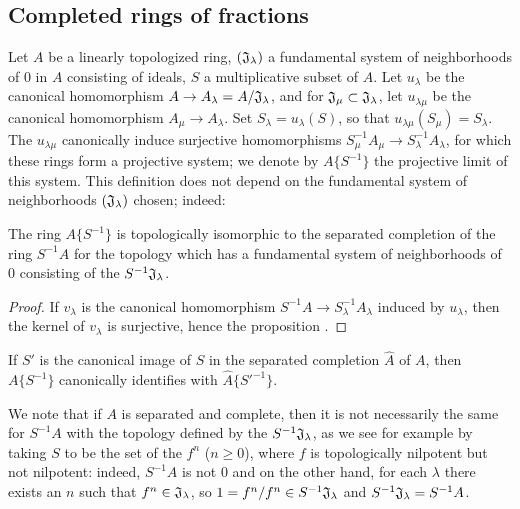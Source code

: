 \subsection{Completed rings of fractions}
\label{subsection-completed-rings-of-fractions}

\begin{env}[7.6.1]
\label{0.7.6.1}
Let $A$ be a linearly topologized ring, $(\mathfrak{J}_\lambda)$ a fundamental system of
neighborhoods of $0$ in $A$ consisting of ideals, $S$ a multiplicative subset of $A$. Let
$u_\lambda$ be the canonical homomorphism $A\to A_\lambda=A/\mathfrak{J}_\lambda$, and for
$\mathfrak{J}_\mu\subset\mathfrak{J}_\lambda$, let $u_{\lambda\mu}$ be the canonical
homomorphism $A_\mu\to A_\lambda$. Set $S_\lambda=u_\lambda(S)$, so that
$u_{\lambda\mu}(S_\mu)=S_\lambda$. The $u_{\lambda\mu}$ canonically induce surjective
homomorphisms $S_\mu^{-1}A_\mu\to S_\lambda^{-1}A_\lambda$, for which these rings form a
projective system; we denote by $A\{S^{-1}\}$ the projective limit of this system. This
definition does not depend on the fundamental system of neighborhoods $(\mathfrak{J}_\lambda)$
chosen; indeed:
\end{env}

\begin{prop}[7.6.2]
\label{0.7.6.2}
The ring $A\{S^{-1}\}$ is topologically isomorphic to the separated completion of the ring
$S^{-1}A$ for the topology which has a fundamental system of neighborhoods of $0$ consisting of
the $S^{-1}\mathfrak{J}_\lambda$.
\end{prop}

\begin{proof}
\label{proof-0.7.6.2}
If $v_\lambda$ is the canonical homomorphism $S^{-1}A\to S_\lambda^{-1}A_\lambda$ induced
by $u_\lambda$, then the kernel of $v_\lambda$ is surjective, hence the proposition .
\end{proof}

\begin{cor}[7.6.3]
\label{0.7.6.3}
If $S'$ is the canonical image of $S$ in the separated completion $\widehat{A}$ of $A$, then
$A\{S^{-1}\}$ canonically identifies with $\widehat{A}\{{S'}^{-1}\}$.
\end{cor}

We note that if $A$ is separated and complete, then it is not necessarily the same for
$S^{-1}A$ with the topology defined by the $S^{-1}\mathfrak{J}_\lambda$, as we see for example
by taking $S$ to be the set of the $f^n$ ($n\geqslant 0$), where $f$ is topologically nilpotent
but not nilpotent: indeed, $S^{-1}A$ is not $0$ and on the other hand, for each $\lambda$ there
exists an $n$ such that $f^n\in\mathfrak{J}_\lambda$, so $1=f^n/f^n\in S^{-1}\mathfrak{J}_\lambda$
and $S^{-1}\mathfrak{J}_\lambda=S^{-1}A$.

